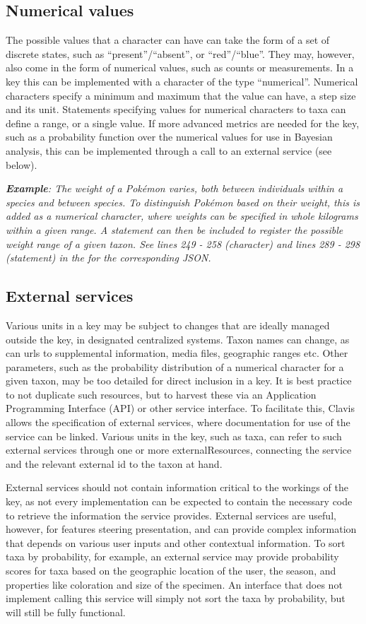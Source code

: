 \documentclass[10pt,letterpaper]{article}
\begin{document}
\subsection*{
Numerical values
}
The possible values that a character can have can take the form of a set of discrete states, such as ``present''/``absent'', or ``red''/``blue''. They may, however, also come in the form of numerical values, such as counts or measurements. In a key this can be implemented with a character of the type ``numerical''. Numerical characters specify a minimum and maximum that the value can have, a step size and its unit. Statements specifying values for numerical characters to taxa can define a range, or a single value. If more advanced metrics are needed for the key, such as a probability function over the numerical values for use in Bayesian analysis, this can be implemented through a call to an external service (see below).

\textit{\textbf{Example}: The weight of a Pokémon varies, both between individuals within a species and between species. To distinguish Pokémon based on their weight, this is added as a numerical character, where weights can be specified in whole kilograms within a given range. A statement can then be included to register the possible weight range of a given taxon. See lines 249 - 258 (character) and lines 289 - 298 (statement) in the  for the corresponding JSON.}
\subsection*{
External services
}
Various units in a key may be subject to changes that are ideally managed outside the key, in designated centralized systems. Taxon names can change, as can urls to supplemental information, media files, geographic ranges etc. Other parameters, such as the probability distribution of a numerical character for a given taxon, may be too detailed for direct inclusion in a key. It is best practice to not duplicate such resources, but to harvest these via an Application Programming Interface (API) or other service interface. To facilitate this, Clavis allows the specification of external services, where documentation for use of the service can be linked. Various units in the key, such as taxa, can refer to such external services through one or more externalResources, connecting the service and the relevant external id to the taxon at hand.

External services should not contain information critical to the workings of the key, as not every implementation can be expected to contain the necessary code to retrieve the information the service provides. External services are useful, however, for features steering presentation, and can provide complex information that depends on various user inputs and other contextual information. To sort taxa by probability, for example, an external service may provide probability scores for taxa based on the geographic location of the user, the season, and properties like coloration and size of the specimen. An interface that does not implement calling this service will simply not sort the taxa by probability, but will still be fully functional.
\end{document}

